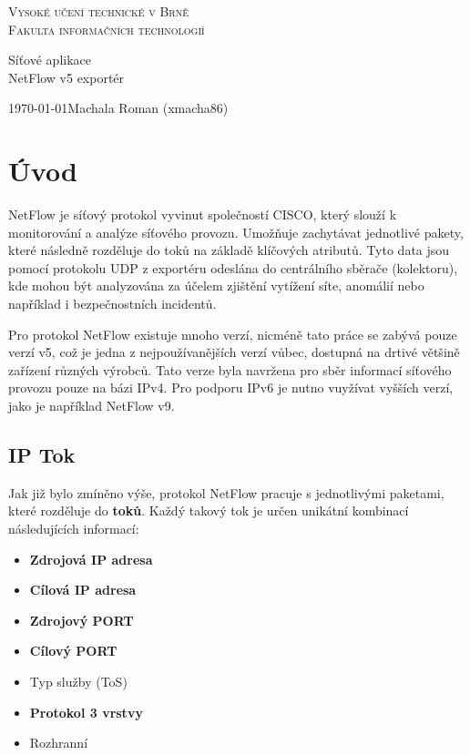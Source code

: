 \documentclass[11pt, a4paper, hidelinks]{article}[08.10.2023]
\begin{document}
\begin{titlepage}
    \begin{center}
        
        {\Huge \textsc{Vysoké učení technické v Brně}\\[0.5em]}
        {\huge \textsc{Fakulta informačních technologií}}
    
        {\LARGE Síťové aplikace\\[0.4em]
        NetFlow v5 exportér}
    
        {\Large \today \hfill {Machala Roman (xmacha86)}}
    \end{center}

\end{titlepage}

\tableofcontents
\pagebreak

\section{Úvod}
    NetFlow je síťový protokol vyvinut společností CISCO, který slouží k monitorování a analýze síťového provozu.
    Umožňuje zachytávat jednotlivé pakety, které následně rozděluje do toků na základě klíčových atributů.
    Tyto data jsou pomocí protokolu UDP z exportéru odeslána do centrálního sběrače (kolektoru), kde
    mohou být analyzována za účelem zjištění vytížení síte, anomálií nebo například i bezpečnostních incidentů\cite{Cisco_2019}.

    Pro protokol NetFlow existuje mnoho verzí, nicméně tato práce se 
    zabývá pouze verzí v5, což je jedna z nejpoužívanějších verzí vůbec, dostupná na drtivé většině
    zařízení různých výrobců. Tato verze byla navržena pro sběr informací síťového
    provozu pouze na bázi IPv4. Pro podporu IPv6 je nutno vuyžívat vyšších verzí, jako je například NetFlow v9\cite{ManageEngine}.

\subsection{IP Tok}\label{tok}
    Jak již bylo zmíněno výše, protokol NetFlow pracuje s jednotlivými paketami, které rozděluje do \textbf{toků}.
    Každý takový tok je určen unikátní kombinací následujících informací:
    \begin{itemize}
        \item{\textbf{Zdrojová IP adresa}}
        \item{\textbf{Cílová IP adresa}}
        \item{\textbf{Zdrojový PORT}}
        \item{\textbf{Cílový PORT}}
        \item{Typ služby (ToS)}
        \item{\textbf{Protokol 3 vrstvy}}
        \item{Rozhranní}
    \end{itemize}
\end{document}
